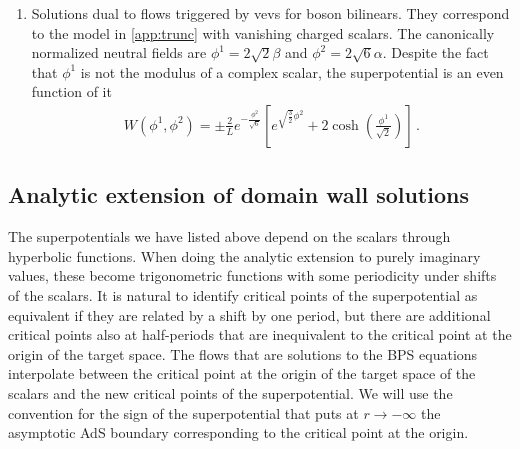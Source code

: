 \begin{enumerate}
\item Solutions dual to flows triggered by vevs for boson bilinears.
They correspond to the model in \cref{app:trunc} with vanishing charged scalars.
The canonically normalized neutral fields are $\phi^1=2\sqrt{2}\beta$ and $\phi^2=2\sqrt{6}\alpha$.
Despite the fact that $\phi^1$ is not the modulus of a complex scalar, the superpotential is an even function of it 
\begin{align}
W(\phi^1,\phi^2)=\pm\frac{2}{L}e^{-\frac{\phi^2}{\sqrt{6}}}\left[e^{\sqrt{\frac{3}{2}}\phi^2}+2\cosh\left(\frac{\phi^1}{\sqrt{2}}\right)\right]\,.
\end{align}

\end{enumerate}

\subsection{Analytic extension of domain wall solutions}
\label{sec:examples}

The superpotentials we have listed above depend on the scalars through hyperbolic functions.
When doing the analytic extension to purely imaginary values, these become trigonometric functions with some periodicity under shifts of the scalars.
It is natural to identify critical points of the superpotential as equivalent if they are related by a shift by one period, but there are additional critical points also at half-periods that are inequivalent to the critical point at the origin of the target space.
The flows that are solutions to the BPS equations  interpolate between the critical point at the origin of the target space of the scalars and the new critical points of the superpotential.
We will use the convention for the sign of the superpotential that puts at $r\to-\infty$ the asymptotic AdS boundary corresponding to the critical point at the origin.

